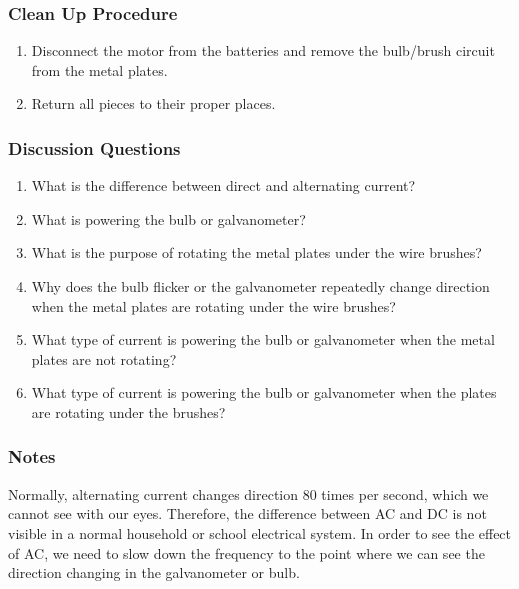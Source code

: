 \subsubsection*{Clean Up Procedure}
\begin{enumerate}
\item{Disconnect the motor from the batteries and remove the bulb/brush circuit from the metal plates.} 
\item{Return all pieces to their proper places.} 
\end{enumerate}

\subsubsection*{Discussion Questions}
\begin{enumerate}
\item{What is the difference between direct and alternating current?}
\item{What is powering the bulb or galvanometer?}
\item{What is the purpose of rotating the metal plates under the wire brushes?}
\item{Why does the bulb flicker or the galvanometer repeatedly change direction when the metal plates are rotating under the wire brushes?}
\item{What type of current is powering the bulb or galvanometer when the metal plates are not rotating?}
\item{What type of current is powering the bulb or galvanometer when the plates are rotating under the brushes?}
\end{enumerate}

\subsubsection*{Notes}
Normally, alternating current changes direction 80 times per second, which we cannot see with our eyes. Therefore, the difference between AC and DC is not visible in a normal household or school electrical system. In order to see the effect of AC, we need to slow down the frequency to the point where we can see the direction changing in the galvanometer or bulb.
